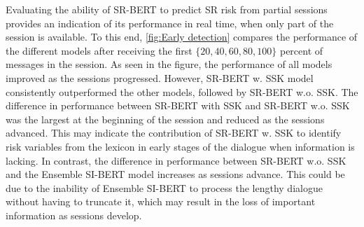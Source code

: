 \documentclass[letterpaper]{article} %
\begin{document}
Evaluating the  ability of SR-BERT to predict SR risk  from  partial sessions provides an indication of  its  performance in real time, when only part of the session is  available. 
To this end, \autoref{fig:Early detection} compares the performance of the different models  after receiving the first  $\{20,40,60,80,100\}$ percent of messages in the session. 
As seen in the figure, the  performance of all models improved  as the sessions progressed.  However, SR-BERT w. SSK model consistently outperformed the other models, followed by SR-BERT w.o. SSK. 
The difference in  performance   between SR-BERT with SSK and SR-BERT w.o. SSK was the largest at the beginning of the session and reduced as the sessions advanced. 
This  may indicate the contribution of  SR-BERT w. SSK to identify risk variables from the lexicon in early stages of the dialogue when information is lacking. 
In contrast, the  difference in performance  between SR-BERT w.o. SSK and the Ensemble SI-BERT model increases as sessions advance. 
This could be due to the inability of Ensemble SI-BERT to  process the lengthy dialogue without having to truncate it, which may result in the loss of important information as sessions develop. 
\end{document}
